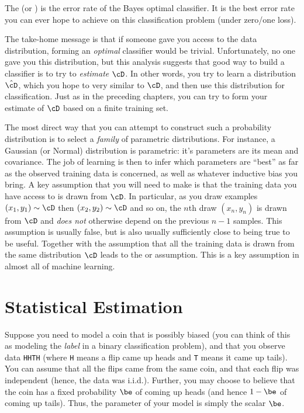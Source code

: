 The  (or )
is the error rate of the Bayes optimal classifier.  It is the best
error rate you can ever hope to achieve on this classification problem
(under zero/one loss).

The take-home message is that if someone gave you access to the data
distribution, forming an \emph{optimal} classifier would be trivial.
Unfortunately, no one gave you this distribution, but this analysis
suggests that good way to build a classifier is to try to
\emph{estimate} $\cD$.  In other words, you try to learn a
distribution $\hat \cD$, which you hope to very similar to $\cD$, and
then use this distribution for classification.  Just as in the
preceding chapters, you can try to form your estimate of $\cD$ based
on a finite training set.

The most direct way that you can attempt to construct such a
probability distribution is to select a \emph{family} of parametric
distributions.  For instance, a Gaussian (or Normal) distribution is
parametric: it's parameters are its mean and covariance.  The job of
learning is then to infer which parameters are ``best'' as far as the
observed training data is concerned, as well as whatever inductive
bias you bring.  A key assumption that you will need to make is that
the training data you have access to is drawn 
from $\cD$.  In particular, as you draw examples $(x_1,y_1) \sim \cD$
then $(x_2,y_2) \sim \cD$ and so on, the $n$th draw $(x_n,y_n)$ is
drawn from $\cD$ and \emph{does not} otherwise depend on the previous
$n-1$ samples.  This assumption is usually false, but is also usually
sufficiently close to being true to be useful.  Together with the
assumption that all the training data is drawn from the same
distribution $\cD$ leads to the  or
 assumption.  This
is a key assumption in almost all of machine learning.

\section{Statistical Estimation}

Suppose you need to model a coin that is possibly biased (you can
think of this as modeling the \emph{label} in a binary classification
problem), and that you observe data \texttt{HHTH} (where
\texttt{H} means a flip came up heads and \texttt{T} means it came up
tails).  You can assume that all the flips came from the same coin,
and that each flip was independent (hence, the data was i.i.d.).
Further, you may choose to believe that the coin has a fixed
probability $\be$ of coming up heads (and hence $1-\be$ of coming up
tails).  Thus, the parameter of your model is simply the scalar $\be$.


